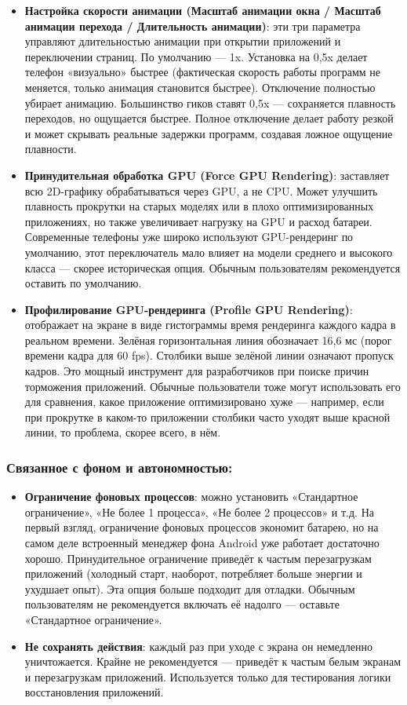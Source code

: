 \begin{itemize}
  \item \textbf{Настройка скорости анимации (Масштаб анимации окна / Масштаб анимации перехода / Длительность анимации)}: эти три параметра управляют длительностью анимации при открытии приложений и переключении страниц. По умолчанию — 1x. Установка на 0,5x делает телефон «визуально» быстрее (фактическая скорость работы программ не меняется, только анимация становится быстрее). Отключение полностью убирает анимацию. Большинство гиков ставят 0,5x — сохраняется плавность переходов, но ощущается быстрее. Полное отключение делает работу резкой и может скрывать реальные задержки программ, создавая ложное ощущение плавности.
  \item \textbf{Принудительная обработка GPU (Force GPU Rendering)}: заставляет всю 2D-графику обрабатываться через GPU, а не CPU. Может улучшить плавность прокрутки на старых моделях или в плохо оптимизированных приложениях, но также увеличивает нагрузку на GPU и расход батареи. Современные телефоны уже широко используют GPU-рендеринг по умолчанию, этот переключатель мало влияет на модели среднего и высокого класса — скорее историческая опция. Обычным пользователям рекомендуется оставить по умолчанию.
  \item \textbf{Профилирование GPU-рендеринга (Profile GPU Rendering)}: отображает на экране в виде гистограммы время рендеринга каждого кадра в реальном времени. Зелёная горизонтальная линия обозначает 16,6 мс (порог времени кадра для 60 fps). Столбики выше зелёной линии означают пропуск кадров. Это мощный инструмент для разработчиков при поиске причин торможения приложений. Обычные пользователи тоже могут использовать его для сравнения, какое приложение оптимизировано хуже — например, если при прокрутке в каком-то приложении столбики часто уходят выше красной линии, то проблема, скорее всего, в нём.
\end{itemize}

\subsubsection*{Связанное с фоном и автономностью:}

\begin{itemize}
  \item \textbf{Ограничение фоновых процессов}: можно установить «Стандартное ограничение», «Не более 1 процесса», «Не более 2 процессов» и т.д. На первый взгляд, ограничение фоновых процессов экономит батарею, но на самом деле встроенный менеджер фона Android уже работает достаточно хорошо. Принудительное ограничение приведёт к частым перезагрузкам приложений (холодный старт, наоборот, потребляет больше энергии и ухудшает опыт). Эта опция больше подходит для отладки. Обычным пользователям не рекомендуется включать её надолго — оставьте «Стандартное ограничение».
  \item \textbf{Не сохранять действия}: каждый раз при уходе с экрана он немедленно уничтожается. Крайне не рекомендуется — приведёт к частым белым экранам и перезагрузкам приложений. Используется только для тестирования логики восстановления приложений.
\end{itemize}

